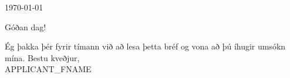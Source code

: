 \documentclass[
    10pt, %
    a4paper, %
    oneside, %
    footinclude, %
    BCOR=5mm, %
]{scrartcl}
\title{\normalfont\fontsize{18}{10}\selectfont \spacedlowsmallcaps{LETTER_TITLE}} %
\subtitle{JOB_TITLE\\\vspace{.5em}APPLICANT_FNAME APPLICANT_LNAME\\\href{mailto:APPLICANT_EMAIL}{APPLICANT_EMAIL} } %
\date{} %
\newcommand{\LetterDate}[1]{\noindent#1\par\vspace{2em}}
\newcommand{\Opening}[1]{\justifying #1\par\vspace{0.5em}}
\newcommand{\Closing}[1]{\vspace{0.5em}\justifying#1}
\newcommand{\Sign}[1]{\vspace{2em}\noindent Bestu kveðjur,\\ #1\par\vspace{0.5em}}
\begin{document}
\maketitle

\vspace{-4em}

\LetterDate{\today}
\vspace{-0.8em}
\Opening{Góðan dag!}
\Closing{Ég þakka þér fyrir tímann við að lesa þetta bréf og vona að þú íhugir umsókn mína.}
\Sign{APPLICANT_FNAME}
\end{document}
